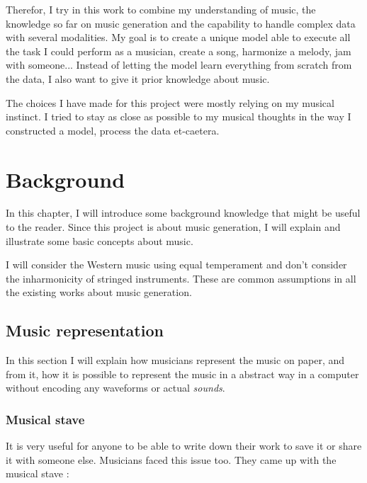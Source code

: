 \documentclass[12pt]{report}
\begin{document}
Therefor, I try in this work to combine my understanding of music, the knowledge so far on music generation and the capability to handle complex data with several modalities.
My goal is to create a unique model able to execute all the task I could perform as a musician, create a song, harmonize a melody, jam with someone...
Instead of letting the model learn everything from scratch from the data, I also want to give it prior knowledge about music.

The choices I have made for this project were mostly relying on my musical instinct.
I tried to stay as close as possible to my musical thoughts in the way I constructed a model, process the data et-caetera.


\chapter{Background}

In this chapter, I will introduce some background knowledge that might be useful to the reader. Since this project is about music generation, I will explain and illustrate some basic concepts about music.

I will consider the Western music using equal temperament and don't consider the inharmonicity of stringed instruments. These are common assumptions in all the existing works about music generation.


\section{Music representation}

In this section I will explain how musicians represent the music on paper, and from it, how it is possible to represent the music in a abstract way in a computer without encoding any waveforms or actual \textit{sounds}.

\subsection{Musical stave}

It is very useful for anyone to be able to write down their work to save it or share it with someone else. Musicians faced this issue too. They came up with the musical stave :
\end{document}
